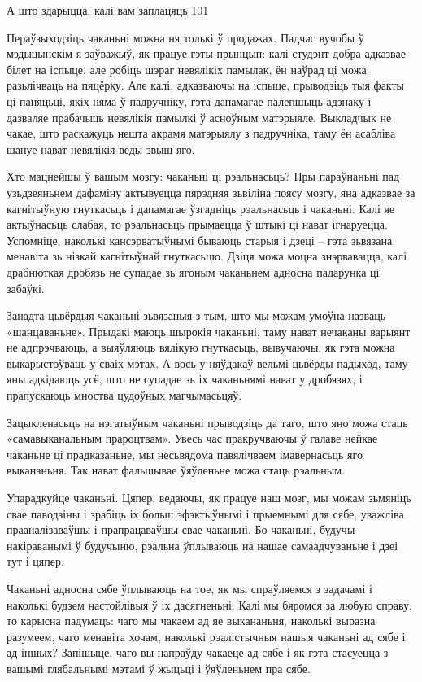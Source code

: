 А што здарыцца, калі вам заплацяць 101%

Пераўзыходзіць чаканьні можна ня толькі ў продажах. Падчас вучобы ў мэдыцынскім я заўважыў, як працуе гэты прынцып: калі студэнт добра адказвае білет на іспыце, але робіць шэраг невялікіх памылак, ён наўрад ці можа разьлічваць на пяцёрку. Але калі, адказваючы на іспыце, прыводзіць тыя факты ці паняцьці, якіх няма ў падручніку, гэта дапамагае палепшыць адзнаку і дазваляе прабачыць невялікія памылкі ў асноўным матэрыяле. Выкладчык не чакае, што раскажуць нешта акрамя матэрыялу з падручніка, таму ён асабліва шануе нават невялікія веды звыш яго.

Хто мацнейшы ў вашым мозгу: чаканьні ці рэальнасьць? Пры параўнаньні пад узьдзеяньнем дафаміну актывуецца пярэдняя зьвіліна поясу мозгу, яна адказвае за кагнітыўную гнуткасьць і дапамагае ўзгадніць рэальнасьць і чаканьні. Калі яе актыўнасьць слабая, то рэальнасьць прымаецца ў штыкі ці нават ігнаруецца. Успомніце, наколькі кансэрватыўнымі бываюць старыя і дзеці – гэта зьвязана менавіта зь нізкай кагнітыўнай гнуткасьцю. Дзіця можа моцна знэрвавацца, калі драбнюткая дробязь не супадае зь ягоным чаканьнем адносна падарунка ці забаўкі.

Занадта цьвёрдыя чаканьні зьвязаныя з тым, што мы можам умоўна назваць «шанцаваньне». Прыдакі маюць шырокія чаканьні, таму нават нечаканы варыянт не адпрэчваюць, а выяўляюць вялікую гнуткасьць, вывучаючы, як гэта можна выкарыстоўваць у сваіх мэтах. А вось у няўдакаў вельмі цьвёрды падыход, таму яны адкідаюць усё, што не супадае зь іх чаканьнямі нават у дробязях, і прапускаюць мноства цудоўных магчымасьцяў.

Зацыкленасьць на нэгатыўным чаканьні прыводзіць да таго, што яно можа стаць «самавыканальным прароцтвам». Увесь час пракручваючы ў галаве нейкае чаканьне ці прадказаньне, мы несьвядома павялічваем імавернасьць яго выкананьня. Так нават фальшывае ўяўленьне можа стаць рэальным.

Упарадкуйце чаканьні. Цяпер, ведаючы, як працуе наш мозг, мы можам зьмяніць свае паводзіны і зрабіць іх больш эфэктыўнымі і прыемнымі для сябе, уважліва прааналізаваўшы і прапрацаваўшы свае чаканьні. Бо чаканьні, будучы накіраванымі ў будучыню, рэальна ўплываюць на нашае самаадчуваньне і дзеі тут і цяпер.

Чаканьні адносна сябе ўплываюць на тое, як мы спраўляемся з задачамі і наколькі будзем настойлівыя ў іх дасягненьні. Калі мы бяромся за любую справу, то карысна падумаць: чаго мы чакаем ад яе выкананьня, наколькі выразна разумеем, чаго менавіта хочам, наколькі рэалістычныя нашыя чаканьні ад сябе і ад іншых? Запішыце, чаго вы напраўду чакаеце ад сябе і як гэта стасуецца з вашымі глябальнымі мэтамі ў жыцьці і ўяўленьнем пра сябе.

